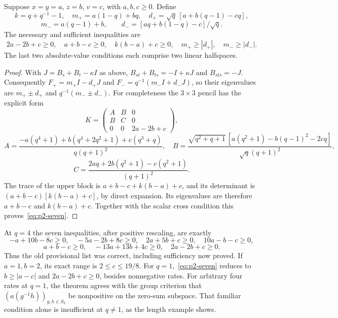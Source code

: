 \begin{corollary}\label{cor:p2-symmetric}
Suppose $x=y=a$, $z=b$, $v=c$, with $a,b,c\geq0$. Define
\[
 k=q+q^{-1}-1,\quad m_+=a(1-q)+bq,\quad
 d_+=\sqrt q\,[a+b(q-1)-cq],
\]
\[
 m_-=a(q-1)+b,\qquad d_-=[aq+b(1-q)-c]/\sqrt q.
\]
The necessary and sufficient inequalities are
\begin{equation}\label{eq:p2-seven}
 2a-2b+c\geq0,\quad a+b-c\geq0,\quad k(b-a)+c\geq0,
 \quad m_+\geq|d_+|,\quad m_-\geq|d_-|.
\end{equation}
The last two absolute-value conditions each comprise two linear halfspaces.
\end{corollary}
\begin{proof}
With $J=B_s+B_t-\kappa I$ as above,
$B_{st}+B_{ts}=-I+\kappa J$ and $B_{sts}=-J$.
Consequently $F_+=m_+I-d_+J$ and $F_-=q^{-1}(m_-I+d_-J)$,
so their eigenvalues are $m_+\pm d_+$ and $q^{-1}(m_-\pm d_-)$.
For completeness the $3\times3$ pencil has the explicit form
\[
 K=\begin{pmatrix}A&B&0\\B&C&0\\0&0&2a-2b+c\end{pmatrix},
\]
\[
 A=\frac{-a(q^4+1)+b(q^4+2q^2+1)+c(q^3+q)}{q(q+1)^2},
 \quad
 B=\frac{\sqrt{q^2+q+1}\,[a(q^2+1)-b(q-1)^2-2cq]}{\sqrt q(q+1)^2},
\]
\[
 C=\frac{2aq+2b(q^2+1)-c(q^2+1)}{(q+1)^2}.
\]
The trace of the upper block is
$a+b-c+k(b-a)+c$, and its determinant is
$(a+b-c)[k(b-a)+c]$, by direct expansion.
Its eigenvalues are therefore $a+b-c$ and $k(b-a)+c$.
Together with the scalar cross condition this proves~\eqref{eq:p2-seven}.
\end{proof}

At $q=4$ the seven inequalities, after positive rescaling, are exactly
\[
 -a+10b-8c\geq0,\quad -5a-2b+8c\geq0,\quad
 2a+5b+c\geq0,\quad 10a-b-c\geq0,
\]
\[
 a+b-c\geq0,\quad -13a+13b+4c\geq0,\quad 2a-2b+c\geq0.
\]
Thus the old provisional list was correct, including sufficiency now
proved. If $a=1,b=2$, its exact range is $2\leq c\leq19/8$.
For $q=1$,~\eqref{eq:p2-seven} reduces to
$b\geq|a-c|$ and $2a-2b+c\geq0$, besides nonnegative rates.
For arbitrary four rates at $q=1$, the theorem agrees with the group
criterion that $(a(g^{-1}h))_{g,h\in S_3}$ be nonpositive on the
zero-sum subspace. That familiar condition alone is insufficient at
$q\ne1$, as the length example shows.

